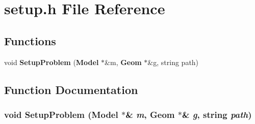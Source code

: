 \section{setup.h File Reference}
\label{setup_h}
\subsection*{Functions}
\begin{CompactItemize}
\item 
void {\bf Setup\-Problem} ({\bf Model} $\ast$\&m, {\bf Geom} $\ast$\&g, string path)
\end{CompactItemize}


\subsection{Function Documentation}
\subsubsection{\setlength{\rightskip}{0pt plus 5cm}void Setup\-Problem ({\bf Model} $\ast$\& {\em m}, {\bf Geom} $\ast$\& {\em g}, string {\em path})}\label{setup_h_a0}


